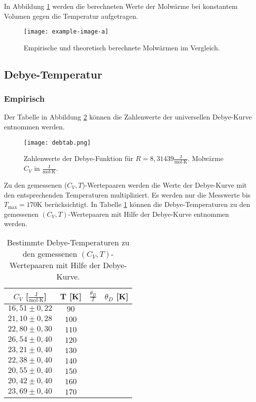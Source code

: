 In Abbildung \ref{C_V} werden die berechneten Werte der Molwärme bei konstantem Volumen gegen die Temperatur aufgetragen.

\begin{figure}[H]
  \centering
  \texttt{[image: example-image-a]}
  \caption{Empirische und theoretisch berechnete Molwärmen im Vergleich.}
  \label{C_V}
\end{figure}

\subsection{Debye-Temperatur}
\subsubsection{Empirisch}

Der Tabelle in Abbildung \ref{debfkt} können die Zahlenwerte der universellen Debye-Kurve entnommen werden.

\begin{figure}[H]
  \centering
  \texttt{[image: debtab.png]}
  \caption{Zahlenwerte der Debye-Funktion für $R = 8,31439\frac{\text{J}}{\text{mol}\cdot\text{K}}$. Molwärme $C_V$ in $\frac{\text{J}}{\text{mol}\cdot\text{K}}$. \cite{skript}}
  \label{debfkt}
\end{figure}

Zu den gemessenen ($C_V,T$)-Wertepaaren werden die Werte der Debye-Kurve mit den entsprechenden Temperaturen multipliziert.
Es werden nur die Messwerte bis $T_{\text{max}} = 170$K berücksichtigt.
In Tabelle \ref{tab:3} können die Debye-Temperaturen zu den gemessenen $(C_V,T)$-Wertepaaren mit Hilfe der Debye-Kurve entnommen werden.

\begin{table}[H]
  \centering
  \begin{tabular}{cccc}
    \toprule
    $C_V$ [$\frac{\text{J}}{\text{mol}\cdot\text{K}}$] & T [K] & $\frac{\theta_D}{T}$ & $\theta_D$ [K] \\
    \midrule
    $16,51 \pm 0,22$ & $ 90$ &  &  \\
    $21,10 \pm 0,28$ & $100$ &  &  \\
    $22,80 \pm 0,30$ & $110$ &  &  \\
    $26,54 \pm 0,40$ & $120$ &  &  \\
    $23,21 \pm 0,40$ & $130$ &  &  \\
    $22,38 \pm 0,40$ & $140$ &  &  \\
    $20,55 \pm 0,40$ & $150$ &  &  \\
    $20,42 \pm 0,40$ & $160$ &  &  \\
    $23,69 \pm 0,40$ & $170$ &  &  \\
    \bottomrule
  \end{tabular}
  \caption{Bestimmte Debye-Temperaturen zu den gemessenen $(C_V,T)$-Wertepaaren mit Hilfe der Debye-Kurve.}
  \label{tab:3}
\end{table}

